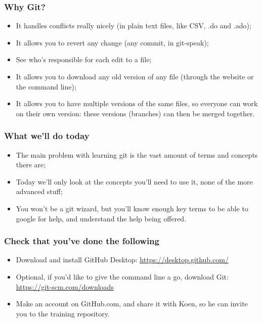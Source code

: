 \documentclass{beamer}
\begin{document}

\begin{frame}
	\frametitle{Why Git?}
	\begin{itemize}
		\item It handles conflicts really nicely (in plain text files, like CSV, .do and .ado);
		\item It allows you to revert any change (any commit, in git-speak);
		\item See who's responsible for each edit to a file;
		\item It allows you to download any old version of any file (through the website or the command line);
		\item It allows you to have multiple versions of the same files, so everyone can work on their own version: these versions (branches) can then be merged together.
	\end{itemize}
\end{frame}

\begin{frame}
	\frametitle{What we'll do today}
	\begin{itemize}
		\item The main problem with learning git is the vast amount of terms and concepts there are;
		\item Today we'll only look at the concepts you'll need to use it, none of the more advanced stuff;
		\item You won't be a git wizard, but you'll know enough key terms to be able to google for help, and understand the help being offered.
	\end{itemize}
\end{frame}

\begin{frame}
\frametitle{Check that you've done the following}
	\begin{itemize}
		\item Download and install GitHub Desktop: \url{https://desktop.github.com/}
		\item Optional, if you'd like to give the command line a go, download Git: \url{https://git-scm.com/downloads} 
		\item Make an account on GitHub.com, and share it with Koen, so he can invite you to the training repository.
	\end{itemize}
\end{frame}

\end{document}
